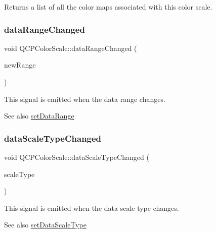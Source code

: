 Returns a list of all the color maps associated with this color scale. \mbox{\label{class_q_c_p_color_scale_a685717490a6aa83c5e711a4f34e837f9}} 
\subsubsection{\texorpdfstring{data\+Range\+Changed}{dataRangeChanged}}
{\footnotesize\ttfamily void Q\+C\+P\+Color\+Scale\+::data\+Range\+Changed (\begin{DoxyParamCaption}\item[{const \hyperlink{class_q_c_p_range}{Q\+C\+P\+Range} \&}]{new\+Range }\end{DoxyParamCaption})\hspace{0.3cm}{\ttfamily [signal]}}

This signal is emitted when the data range changes.

\begin{DoxySeeAlso}{See also}
\hyperlink{class_q_c_p_color_scale_abe88633003a26d1e756aa74984587fef}{set\+Data\+Range} 
\end{DoxySeeAlso}
\mbox{\label{class_q_c_p_color_scale_a61558b962f7791ff2f15a565dcf60181}} 
\subsubsection{\texorpdfstring{data\+Scale\+Type\+Changed}{dataScaleTypeChanged}}
{\footnotesize\ttfamily void Q\+C\+P\+Color\+Scale\+::data\+Scale\+Type\+Changed (\begin{DoxyParamCaption}\item[{\hyperlink{class_q_c_p_axis_a36d8e8658dbaa179bf2aeb973db2d6f0}{Q\+C\+P\+Axis\+::\+Scale\+Type}}]{scale\+Type }\end{DoxyParamCaption})\hspace{0.3cm}{\ttfamily [signal]}}

This signal is emitted when the data scale type changes.

\begin{DoxySeeAlso}{See also}
\hyperlink{class_q_c_p_color_scale_aeb6107d67dd7325145b2498abae67fc3}{set\+Data\+Scale\+Type} 
\end{DoxySeeAlso}
\mbox{\label{class_q_c_p_color_scale_a5e5f8c5626242c8f7308bfab74d3d989}} 
